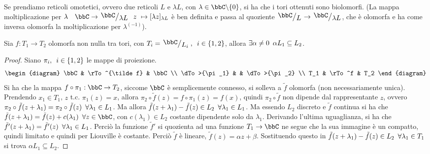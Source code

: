 \begin{osservazione}
Se prendiamo reticoli omotetici, ovvero due reticoli $L$ e $\lambda L$, con $\lambda \in \bbC\minus\{ 0\}$, si ha che i tori ottenuti sono biolomorfi. (La mappa moltiplicazione per $\lambda \quad \bbC \rightarrow \quotient{\bbC}{\lambda L} \hquad z\ \mapsto [\lambda z]_{\lambda L} $ è ben definita e passa al quoziente $\quotient{\bbC}{L}\rightarrow \quotient{\bbC}{\lambda L}$, che è olomorfa e ha come inversa olomorfa la moltiplicazione per $\lambda^{(-1)}$).
\end{osservazione}

\begin{proposizione}Sia $f:T_1\rightarrow T_2$ olomorfa non nulla tra tori, con $T_i=\quotient{\bbC}{L_i},\hquad i\in \{ 1,2\}$, allora $\exists\alpha\neq0 \hskip0.5em\relax \alpha L_1\subseteq L_2$.
\end{proposizione}
\begin{proof} Siano $\pi_i,\hskip0.5em\relax i\in \{ 1,2\}$ le mappe di proiezione.
    \[
        \begin{diagram}
            \bbC            & \rTo^{\tilde f} 	& \bbC 		 	\\
            \dTo>{\pi_1}	&					& \dTo>{\pi_2}		\\
            T_1   			& \rTo^f 			& T_2
        \end{diagram}
    \]
Si ha che la mappa $f\circ\pi_1: \bbC\rightarrow T_2$, siccome $\bbC$ è semplicemente connesso, si solleva a $\tilde{f}$ olomorfa (non necessariamente unica).
Prendendo $x_1\in T_1$, $z$ t.c. $\pi_1(z)=x$, allora $\pi_2\circ\tilde{f} (z) = f\circ \pi_1 (z)= f(x)$, quindi $\pi_2\circ \tilde{f}$ non dipende dal rappresentante $z$, ovvero $\pi_2\circ \tilde{f} (z+\lambda_1)=\pi_2\circ \tilde{f} (z)\hskip0.5em\relax \forall \lambda_1\in L_1$.
Ma allora $\tilde{f} (z+\lambda_1) - \tilde{f} (z) \in L_2 \hskip0.5em\relax \forall \lambda_1 \in L_1$.
Ma essendo $L_2$ discreto e $\tilde{f}$ continua si ha che $\tilde{f}(z+\lambda_1)=\tilde{f}(z)+c(\lambda_1)\hquad \forall z\in\bbC$, con $c(\lambda_1)\in L_2$ costante dipendente solo da $\lambda_1$.
Derivando l'ultima uguaglianza, si ha che $\tilde{f}'(z+\lambda_1)=\tilde{f}'(z) \hskip0.5em\relax\forall \lambda_1\in L_1$.
Perciò la funzione $\tilde{f}'$ si quozienta ad una funzione  $T_1\rightarrow \bbC$ ne segue che la sua immagine è un compatto, quindi limitato e quindi per Liouville è costante.
Perciò $\tilde{f}$ è lineare, $\tilde{f}(z)=\alpha z+\beta$.
Sostituendo questo in $\tilde{f} (z+\lambda_1) - \tilde{f} (z) \in L_2 \hskip0.5em\relax \forall \lambda_1 \in T_1$ si trova $\alpha L_1\subseteq L_2$.
\end{proof}

